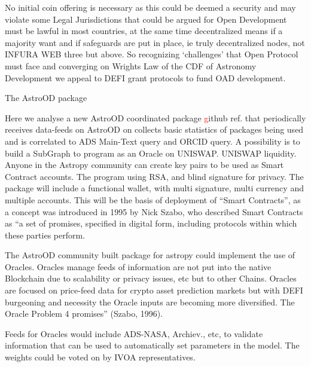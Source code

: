 \documentclass[final,5p,times,twocolumn,authoryear]{elsarticle}
\begin{document}
No initial coin offering is necessary as this could be deemed a security and may violate some Legal Jurisdictions that could be argued for Open Development must be lawful in most countries, at the same time decentralized means if a majority want and if safeguards are put in place, ie truly decentralized nodes, not INFURA WEB three but above. So recognizing `challenges' that Open Protocol must face and converging on Wrights Law of the CDF of Astronomy Development we appeal to DEFI grant protocols to fund OAD development. 


The AstroOD package 

Here we analyse a new AstroOD coordinated package \textcolor{red} github ref. that periodically receives data-feeds on AstroOD on collects basic statistics of packages being used and is correlated to ADS Main-Text query and ORCID query. A possibility is to build a SubGraph to program as an Oracle on UNISWAP. UNISWAP liquidity. Anyone in the Astropy community can create key pairs to be used as Smart Contract accounts. The program using RSA, and blind signature for privacy. The package will include a functional wallet, with multi signature, multi currency and multiple accounts. This will be the basis of deployment of “Smart Contracts”, as a concept was introduced in 1995 by Nick Szabo, who described Smart Contracts as “a set of promises,
specified in digital form, including protocols within which these parties perform.

The AstroOD community built package for astropy could implement the use of Oracles. Oracles manage feeds of information are not put into the native Blockchain due to scalability or privacy issues, etc but to other Chains.  Oracles are focused on price-feed data for crypto asset prediction markets but with DEFI burgeoning and necessity the Oracle inputs are becoming more diversified.  The Oracle Problem 4 promises” (Szabo, 1996). 

Feeds for Oracles would include ADS-NASA, Archiev., etc,  to validate information that can be used to automatically set parameters in the model. The weights could be voted on by IVOA representatives.
\end{document}
